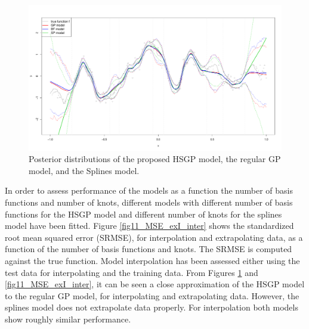 \documentclass[]{interact}
\theoremstyle{plain}%
\theoremstyle{definition}
\theoremstyle{remark}
\begin{document}
\begin{figure}[H]
\centering
\includegraphics[scale=0.35]{fig10_Posteriors_exI.pdf}
\caption{Posterior distributions of the proposed HSGP model, the regular GP model, and the Splines model.}
  \label{fig10_Posteriors_exI}
\end{figure}

In order to assess performance of the models as a function the number of basis functions and number of knots, different models with different number of basis functions for the HSGP model and different number of knots for the splines model have been fitted. Figure \ref{fig11_MSE_exI_inter} shows the  standardized root mean squared error (SRMSE), for interpolation and extrapolating data, as a function of the number of basis functions and knots. The SRMSE is computed against the true function. Model interpolation has been assessed either using the test data for interpolating and the training data. From Figures \ref{fig10_Posteriors_exI} and \ref{fig11_MSE_exI_inter}, it can be seen a close approximation of the HSGP model to the regular GP model, for interpolating and extrapolating data. However, the splines model does not extrapolate data properly. For interpolation both models show roughly similar performance.
\end{document}

